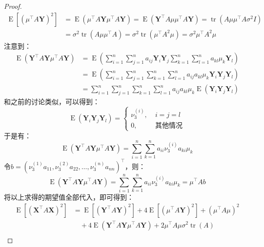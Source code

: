 \begin{proof}
	\begin{align*}
		\operatorname{E}[(\mu^{\top}A\mathbf{Y})^2]
		&=\operatorname{E}(\mu^{\top}A\mathbf{Y}\mu^{\top}A\mathbf{Y})
		=\operatorname{E}(\mathbf{Y}^{\top}A\mu\mu^{\top}A\mathbf{Y})
		=\operatorname{tr}(A\mu\mu^{\top}A\sigma^2I) \\
		&=\sigma^2\operatorname{tr}(A\mu\mu^{\top}A)
		=\sigma^2\operatorname{tr}(\mu^{\top}A^2\mu)
		=\sigma^2\mu^{\top}A^2\mu
	\end{align*}
	注意到：
	\begin{align*}
		\operatorname{E}(\mathbf{Y}^{\top}A\mathbf{Y}\mu^{\top}A\mathbf{Y})
		&=\operatorname{E}\left(\sum_{i=1}^{n}\sum_{j=1}^{n}a_{ij}\mathbf{Y}_i\mathbf{Y}_j\sum_{k=1}^{n}\sum_{l=1}^{n}a_{kl}\mu_k\mathbf{Y}_l\right) \\
		&=\operatorname{E}\left(\sum_{i=1}^{n}\sum_{j=1}^{n}\sum_{k=1}^{n}\sum_{l=1}^{n}a_{ij}a_{kl}\mu_k\mathbf{Y}_i\mathbf{Y}_j\mathbf{Y}_l\right) \\
		&=\sum_{i=1}^{n}\sum_{j=1}^{n}\sum_{k=1}^{n}\sum_{l=1}^{n}a_{ij}a_{kl}\mu_k\operatorname{E}(\mathbf{Y}_i\mathbf{Y}_j\mathbf{Y}_l)
	\end{align*}
	和之前的讨论类似，可以得到：
	\begin{equation*}
		\operatorname{E}(\mathbf{Y}_i\mathbf{Y}_j\mathbf{Y}_l)=
		\begin{cases}
			\nu_3^{(i)},\;&i=j=l \\
			0,\;&\text{其他情况}
		\end{cases}
	\end{equation*}
	于是有：
	\begin{equation*}
		\operatorname{E}(\mathbf{Y}^{\top}A\mathbf{Y}\mu^{\top}A\mathbf{Y})
		=\sum_{i=1}^{n}\sum_{k=1}^{n}a_{ii}\nu_3^{(i)}a_{ki}\mu_k
	\end{equation*}
	令$b=(\nu_3^{(1)}a_{11},\nu_3^{(2)}a_{22},\dots,\nu_3^{(n)}a_{nn})^{\top}$，则：
	\begin{equation*}
		\operatorname{E}(\mathbf{Y}^{\top}A\mathbf{Y}\mu^{\top}A\mathbf{Y})
		=\sum_{i=1}^{n}\sum_{k=1}^{n}a_{ii}\nu_3^{(i)}a_{ki}\mu_k=\mu^{\top}Ab
	\end{equation*}
	将以上求得的期望值全部代入，即可得到：
	\begin{align*}
		\operatorname{E}[(\mathbf{X}^{\top}A\mathbf{X})^2]
		&=\operatorname{E}[(\mathbf{Y}^{\top}A\mathbf{Y})^2]+4\operatorname{E}[(\mu^{\top}A\mathbf{Y})^2]+(\mu^{\top}A\mu)^2 \\
		&\quad+4\operatorname{E}(\mathbf{Y}^{\top}A\mathbf{Y}\mu^{\top}A\mathbf{Y})+2\mu^{\top}A\mu\sigma^2\operatorname{tr}(A) \\

\end{align*}
\end{proof}
